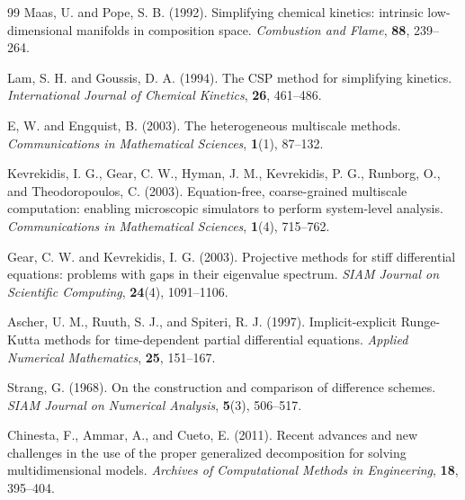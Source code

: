 \documentclass[11pt]{article}
\begin{document}
\begin{thebibliography}{99}
Maas, U. and Pope, S. B. (1992).
\newblock Simplifying chemical kinetics: intrinsic low-dimensional manifolds in
composition space.
\newblock \emph{Combustion and Flame}, \textbf{88}, 239--264.

Lam, S. H. and Goussis, D. A. (1994).
\newblock The CSP method for simplifying kinetics.
\newblock \emph{International Journal of Chemical Kinetics}, \textbf{26}, 461--486.

E, W. and Engquist, B. (2003).
\newblock The heterogeneous multiscale methods.
\newblock \emph{Communications in Mathematical Sciences}, \textbf{1}(1), 87--132.

Kevrekidis, I. G., Gear, C. W., Hyman, J. M., Kevrekidis, P. G., Runborg, O.,
and Theodoropoulos, C. (2003).
\newblock Equation-free, coarse-grained multiscale computation: enabling
microscopic simulators to perform system-level analysis.
\newblock \emph{Communications in Mathematical Sciences}, \textbf{1}(4), 715--762.

Gear, C. W. and Kevrekidis, I. G. (2003).
\newblock Projective methods for stiff differential equations: problems with
gaps in their eigenvalue spectrum.
\newblock \emph{SIAM Journal on Scientific Computing}, \textbf{24}(4), 1091--1106.

Ascher, U. M., Ruuth, S. J., and Spiteri, R. J. (1997).
\newblock Implicit-explicit Runge-Kutta methods for time-dependent partial
differential equations.
\newblock \emph{Applied Numerical Mathematics}, \textbf{25}, 151--167.

Strang, G. (1968).
\newblock On the construction and comparison of difference schemes.
\newblock \emph{SIAM Journal on Numerical Analysis}, \textbf{5}(3), 506--517.

Chinesta, F., Ammar, A., and Cueto, E. (2011).
\newblock Recent advances and new challenges in the use of the proper
generalized decomposition for solving multidimensional models.
\newblock \emph{Archives of Computational Methods in Engineering}, \textbf{18}, 395--404.

\end{thebibliography}
\end{document}
